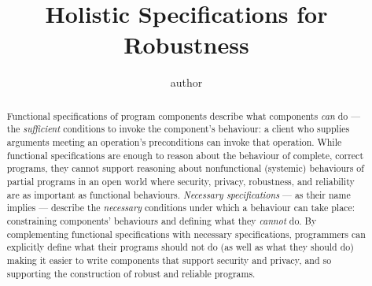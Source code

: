 \documentclass[acmsmall,screen]{acmart}
\begin{document}

\author{ author}
 


\title{Holistic Specifications for Robustness} 




\begin{abstract}
Functional specifications of program components describe what
components \emph{can} do --- the \emph{sufficient} conditions to
invoke the component's behaviour: a client who supplies arguments
meeting an operation's preconditions can invoke that operation. While
functional specifications are enough to reason about the behaviour of
complete, correct programs, they cannot support reasoning about
nonfunctional (systemic) behaviours of partial programs in an open
world where security, privacy, robustness, and reliability are as
important as functional behaviours. \emph{Necessary specifications}
--- as their name implies --- describe the \emph{necessary}
conditions under which a behaviour can take place: constraining
components' behaviours and defining what they \emph{cannot} do.  By
complementing functional specifications with necessary specifications,
programmers can explicitly define what their programs should not do
(as well as what they should do) making it easier to write components
that support security and privacy, and so supporting the construction
of robust and reliable programs.



\end{abstract}


\maketitle
\end{document}
